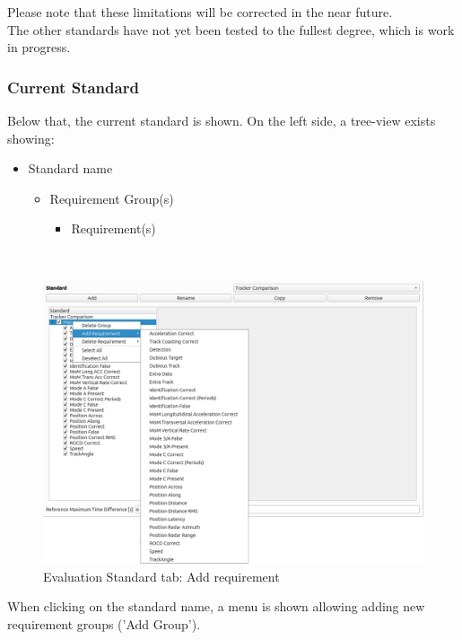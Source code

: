 Please note that these limitations will be corrected in the near future. \\ 

The other standards have not yet been tested to the fullest degree, which is work in progress.

\subsubsection{Current Standard}

Below that, the current standard is shown. On the left side, a tree-view exists showing:
\begin{itemize}  
\item Standard name
\begin{itemize}  
\item Requirement Group(s)
\begin{itemize}  
\item Requirement(s)
\end{itemize}
\end{itemize}
\end{itemize}
\ \\

\begin{figure}[H]
  \hspace*{-2cm}
    \includegraphics[width=18cm,frame]{figures/eval_standard_add_req.png}
  \caption{Evaluation Standard tab: Add requirement}
\end{figure}

When clicking on the standard name, a menu is shown allowing adding new requirement groups ('Add Group'). \\

